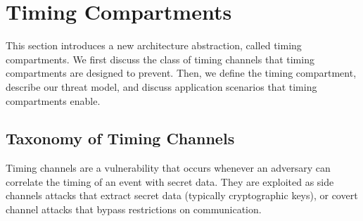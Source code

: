 \section{Timing Compartments}

This section introduces a new architecture abstraction, called timing 
compartments.
We first discuss the class of timing channels that timing compartments are 
designed
to prevent.  Then, we define the timing compartment, describe our threat model,
and discuss application scenarios that timing compartments enable.


\subsection{Taxonomy of Timing Channels}


Timing channels are a vulnerability that occurs whenever an adversary can 
correlate the timing of an event with secret data.
They are exploited as side channels attacks that extract secret data (typically 
cryptographic keys), or covert channel attacks that bypass restrictions on 
communication.


